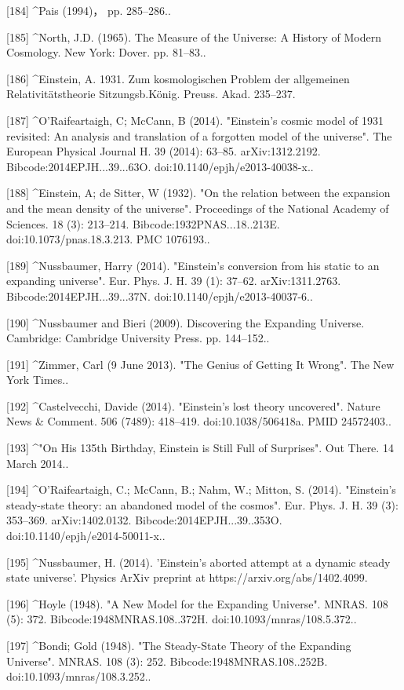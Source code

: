 [184]
^Pais (1994)， pp. 285–286..

[185]
^North, J.D. (1965). The Measure of the Universe: A History of Modern Cosmology. New York: Dover. pp. 81–83..

[186]
^Einstein, A. 1931. Zum kosmologischen Problem der allgemeinen Relativitätstheorie Sitzungsb.König. Preuss. Akad. 235–237.

[187]
^O'Raifeartaigh, C; McCann, B (2014). "Einstein's cosmic model of 1931 revisited: An analysis and translation of a forgotten model of the universe". The European Physical Journal H. 39 (2014): 63–85. arXiv:1312.2192. Bibcode:2014EPJH...39...63O. doi:10.1140/epjh/e2013-40038-x..

[188]
^Einstein, A; de Sitter, W (1932). "On the relation between the expansion and the mean density of the universe". Proceedings of the National Academy of Sciences. 18 (3): 213–214. Bibcode:1932PNAS...18..213E. doi:10.1073/pnas.18.3.213. PMC 1076193..

[189]
^Nussbaumer, Harry (2014). "Einstein's conversion from his static to an expanding universe". Eur. Phys. J. H. 39 (1): 37–62. arXiv:1311.2763. Bibcode:2014EPJH...39...37N. doi:10.1140/epjh/e2013-40037-6..

[190]
^Nussbaumer and Bieri (2009). Discovering the Expanding Universe. Cambridge: Cambridge University Press. pp. 144–152..

[191]
^Zimmer, Carl (9 June 2013). "The Genius of Getting It Wrong". The New York Times..

[192]
^Castelvecchi, Davide (2014). "Einstein's lost theory uncovered". Nature News & Comment. 506 (7489): 418–419. doi:10.1038/506418a. PMID 24572403..

[193]
^"On His 135th Birthday, Einstein is Still Full of Surprises". Out There. 14 March 2014..

[194]
^O'Raifeartaigh, C.; McCann, B.; Nahm, W.; Mitton, S. (2014). "Einstein's steady-state theory: an abandoned model of the cosmos". Eur. Phys. J. H. 39 (3): 353–369. arXiv:1402.0132. Bibcode:2014EPJH...39..353O. doi:10.1140/epjh/e2014-50011-x..

[195]
^Nussbaumer, H. (2014). 'Einstein’s aborted attempt at a dynamic steady state universe’. Physics ArXiv preprint at https://arxiv.org/abs/1402.4099.

[196]
^Hoyle (1948). "A New Model for the Expanding Universe". MNRAS. 108 (5): 372. Bibcode:1948MNRAS.108..372H. doi:10.1093/mnras/108.5.372..

[197]
^Bondi; Gold (1948). "The Steady-State Theory of the Expanding Universe". MNRAS. 108 (3): 252. Bibcode:1948MNRAS.108..252B. doi:10.1093/mnras/108.3.252..

